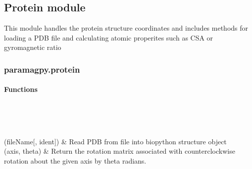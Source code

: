 \documentclass[a4paper,10pt,english,openany,oneside]{sphinxmanual}
\begin{document}
\subsection{Protein module}
\label{\detokenize{reference/index:protein-module}}
\sphinxAtStartPar
This module handles the protein structure coordinates and includes methods for
loading a PDB file and calculating atomic properites such as CSA or gyromagnetic ratio


\subsubsection{paramagpy.protein}
\label{\detokenize{reference/protein:module-paramagpy.protein}}\label{\detokenize{reference/protein:paramagpy-protein}}\label{\detokenize{reference/protein:protein}}\label{\detokenize{reference/protein::doc}}

\paragraph{Functions}
\label{\detokenize{reference/protein:functions}}

\begin{savenotes}\sphinxatlongtablestart\begin{longtable}[c]{}
\hline

\endfirsthead

%
{}\\
\hline

\endhead

\hline
{}\\
\endfoot

\endlastfoot

\sphinxAtStartPar
{\hyperref[\detokenize{reference/generated/paramagpy.protein.load_pdb:paramagpy.protein.load_pdb}]{}}(fileName{[}, ident{]})
&
\sphinxAtStartPar
Read PDB from file into biopython structure object
\\
\hline
\sphinxAtStartPar
{\hyperref[\detokenize{reference/generated/paramagpy.protein.rotation_matrix:paramagpy.protein.rotation_matrix}]{}}(axis, theta)
&
\sphinxAtStartPar
Return the rotation matrix associated with counterclockwise rotation about the given axis by theta radians.
\\
\hline
\end{longtable}\sphinxatlongtableend\end{savenotes}
\end{document}
